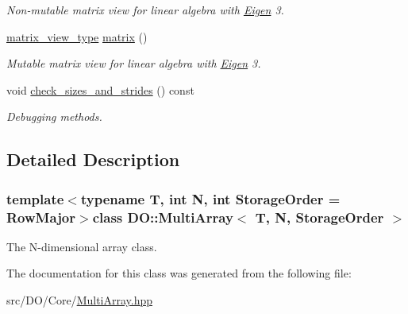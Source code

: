 \begin{DoxyCompactItemize}
\begin{DoxyCompactList}\small\item\em Non-\/mutable matrix view for linear algebra with \hyperlink{namespace_eigen}{Eigen} 3. \end{DoxyCompactList}\item 
\hypertarget{class_d_o_1_1_multi_array_a2661eb3a043e573e6039849f9742975a}{\hyperlink{class_d_o_1_1_multi_array_a185870835281f858bc66928f6c9e1e52}{matrix\-\_\-view\-\_\-type} \hyperlink{class_d_o_1_1_multi_array_a2661eb3a043e573e6039849f9742975a}{matrix} ()}\label{class_d_o_1_1_multi_array_a2661eb3a043e573e6039849f9742975a}

\begin{DoxyCompactList}\small\item\em Mutable matrix view for linear algebra with \hyperlink{namespace_eigen}{Eigen} 3. \end{DoxyCompactList}\item 
\hypertarget{class_d_o_1_1_multi_array_af05ca63ef4968e9da0971052f416df2c}{void \hyperlink{class_d_o_1_1_multi_array_af05ca63ef4968e9da0971052f416df2c}{check\-\_\-sizes\-\_\-and\-\_\-strides} () const }\label{class_d_o_1_1_multi_array_af05ca63ef4968e9da0971052f416df2c}

\begin{DoxyCompactList}\small\item\em Debugging methods. \end{DoxyCompactList}\end{DoxyCompactItemize}


\subsection{Detailed Description}
\subsubsection*{template$<$typename T, int N, int Storage\-Order = Row\-Major$>$class D\-O\-::\-Multi\-Array$<$ T, N, Storage\-Order $>$}

The N-\/dimensional array class. 

The documentation for this class was generated from the following file\-:\begin{DoxyCompactItemize}
\item 
src/\-D\-O/\-Core/\hyperlink{_multi_array_8hpp}{Multi\-Array.\-hpp}\end{DoxyCompactItemize}

